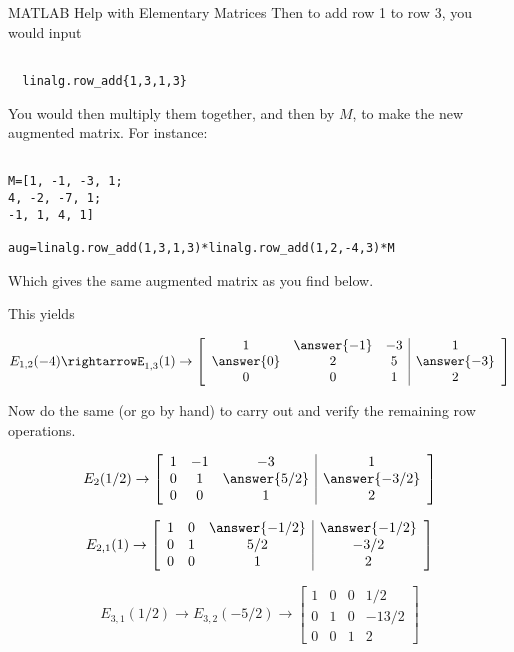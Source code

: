 \documentclass{ximera}
\begin{document}
\begin{exploration}
\begin{remark}{MATLAB Help with Elementary Matrices}
Then to add row 1 to row 3, you would input


\begin{verbatim}

  linalg.row_add{1,3,1,3}

\end{verbatim}

You would then multiply them together, and then by $M$, to make the new augmented matrix. For instance:

\begin{verbatim}

M=[1, -1, -3, 1;
4, -2, -7, 1;
-1, 1, 4, 1]

aug=linalg.row_add(1,3,1,3)*linalg.row_add(1,2,-4,3)*M

\end{verbatim}

Which gives the same augmented matrix as you find below.

\end{remark}



 This yields

 \[
E_{1,2}(-4)\rightarrow%
E_{1,3}(1)\rightarrow%
\left[\begin{array}{ccc|c} 
  1&\answer{-1}&-3&1\\\answer{0}&2&5&\answer{-3}\\0&0&1&2
  \end{array}\right]
\]

Now do the same (or go by hand) to carry out and verify the remaining row operations.

\[
E_{2}(1/2)\rightarrow
\left[\begin{array}{ccc|c} 
  1&-1&-3&1\\0&1&\answer{5/2}&\answer{-3/2}\\0&0&1&2
  \end{array}\right]
\]

\[
E_{2,1}(1)\rightarrow
\left[\begin{array}{ccc|c} 
  1&0&\answer{-1/2}&\answer{-1/2}\\0&1&5/2&-3/2\\0&0&1&2
  \end{array}\right]
\]


\[
E_{3,1}(1/2)\rightarrow E_{3,2}(-5/2)\rightarrow
\left[\begin{array}{ccc|c} 
  1&0&0&1/2\\0&1&0&-13/2\\0&0&1&2
  \end{array}\right]
\]


\end{exploration}
\end{document}
